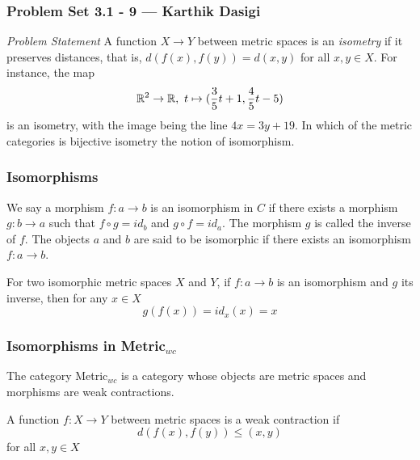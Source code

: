 
\begin{frame}
    \frametitle{Problem Set 3.1 - 9 --- Karthik Dasigi}
    \emph{Problem Statement}
    A function \(X\rightarrow Y\) between metric spaces is an \textit{isometry} if 
    it preserves distances, that is, \(d(f(x),f(y))=d(x,y)\) for all \(x,y \in X\).
    For instance, the map
    \begin{equation}
        \mathbb{R}^2 \rightarrow \mathbb{R} , \text{    } t \mapsto (\frac{3}{5}t+1, \frac{4}{5}t -5)
    \end{equation}
    is an isometry, with the image being the line \(4x =3y + 19\). 
    In which of the metric categories is bijective isometry the notion of isomorphism.
\end{frame}

\begin{frame}
    \frametitle{Isomorphisms}
    \begin{definition}[Isomorphism]
        We say a morphism \(f : a \rightarrow b\) is an isomorphism in \(C\) if there exists a morphism
        \(g : b \rightarrow a\) such that \(f \circ g = id_b\) and \(g \circ f = id_a\). The morphism \(g\) is called the inverse
        of \(f\). The objects \(a\) and \(b\) are said to be isomorphic if there exists an isomorphism \(f:a\rightarrow b\).
    \end{definition}
    \pause
    For two isomorphic metric spaces \(X\) and \(Y\), if \(f:a\rightarrow b\) is an isomorphism and \(g\) its inverse,
    then for any \(x\in X\)
    \begin{equation}
        g(f(x))=id_x(x)=x 
        \label{eqn:gfresult}
    \end{equation}
    
\end{frame}

\begin{frame}
    \frametitle{Isomorphisms in Metric\(_{wc}\)}
    The category Metric\(_{wc}\) is a category whose objects are metric spaces and morphisms are weak contractions.
    \pause
    \begin{definition}
        A function \(f : X \rightarrow Y\) between metric spaces is a
        weak contraction if
        \begin{equation}
            d(f(x),f(y))\leq (x,y)
            \label{eqn:wc}
        \end{equation}
        for all \(x,y\in X\)
    \end{definition}

\end{frame}

